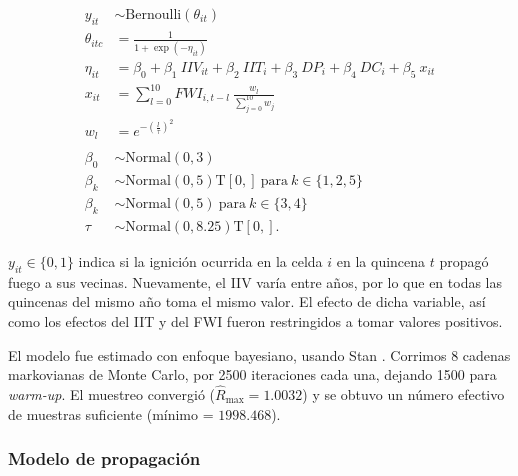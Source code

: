 \begin{equation}
\label{eq:escape}
\begin{aligned}
    y_{it} &\sim \text{Bernoulli}(\theta_{it}) \\
    \theta_{itc} &= \frac{1}{1 + \exp{(-\eta_{it})}} \\
    \eta_{it} &= \beta_0 + \beta_1 \ IIV_{it} + \beta_2 \ IIT_i + \beta_3 \ DP_i + \beta_4 \ DC_i + \beta_5 \ x_{it} \\
    x_{it} &= \sum_{l=0}^{10} FWI_{i,t-l} \ \frac{w_l}{\sum_{j=0}^{10} w_j} \\
    w_l &= e^{-\left(\frac{l}{\tau}\right)^2}\\
    \
    \\
    \beta_0 &\sim \text{Normal}(0, 3) \\ 
    \beta_k &\sim \text{Normal}(0, 5)\text{T}[0, ] \  \text{para} \ k \in \{1, 2, 5\} \\
    \beta_k &\sim \text{Normal}(0, 5) \  \text{para} \ k \in \{3, 4\} \\
    \tau &\sim \text{Normal}(0, 8.25)\text{T}[0, ]. 
\end{aligned}
\end{equation}

\noindent $y_{it} \in \{0, 1\}$ indica si la ignición ocurrida en la celda $i$ en la quincena $t$ propagó fuego a sus vecinas. Nuevamente, el IIV varía entre años, por lo que en todas las quincenas del mismo año toma el mismo valor. El efecto de dicha variable, así como los efectos del IIT y del FWI fueron restringidos a tomar valores positivos. 

El modelo fue estimado con enfoque bayesiano, usando Stan \citep{stan_development_team_rstan_2022}. Corrimos 8 cadenas markovianas de Monte Carlo, por 2500 iteraciones cada una, dejando 1500 para \textit{warm-up}. El muestreo convergió ($\hat{R}_{\text{max}} = 1.0032$) y se obtuvo un número efectivo de muestras suficiente (mínimo = $1998.468$).

\subsubsection{Modelo de propagación}\label{cap4:spread-model}

